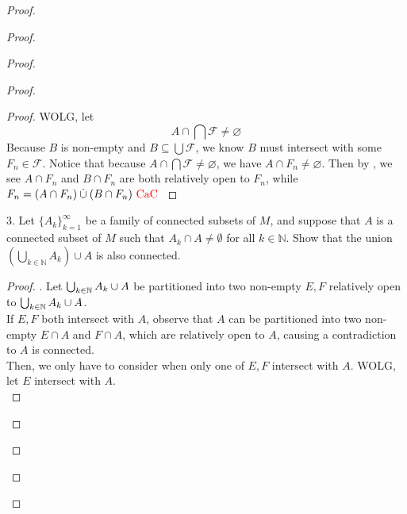 \documentclass{report}
\begin{document}
\begin{proof}
\begin{proof}
\begin{proof}
\begin{proof}
\begin{proof}
WOLG, let
\begin{equation}
A\cap \bigcap \mathcal{F}\neq \varnothing
\end{equation}
Because $B$ is non-empty and $B\subseteq \bigcup \mathcal{F}$, we know $B$ must intersect with some $F_n\in \mathcal{F}$. Notice that because $A\cap \bigcap \mathcal{F}\neq \varnothing$, we have $A\cap F_n\neq \varnothing$. Then by , we see $A\cap F_n$ and $B\cap F_n$ are both relatively open to $F_n$, while $F_n= (A\cap F_n)\mathbin{\dot{\cup}} (B\cap F_n)\text{ \textcolor{red}{CaC} }$ 
\end{proof}
\begin{question}{}{}
3. Let $\{A_k\}_{k=1}^{\infty}$ be a family of connected subsets of $M$, and suppose that $A$ is a connected subset of $M$ such that $A_k \cap A \neq \emptyset$ for all $k \in \mathbb{N}$. Show that the union $\left(\bigcup_{k \in \mathbb{N}} A_k\right) \cup A$ is also connected.
\end{question}
\begin{proof}
. Let $\bigcup_{k\in\mathbb{N}}A_k\cup A$ be partitioned into two non-empty  $E,F$ relatively open to  $\bigcup_{k\in\mathbb{N}}A_k\cup A$.\\

If $E,F$ both intersect with  $A$, observe that $A$ can be partitioned into two non-empty $E\cap A$ and $F\cap A$, which are relatively open to $A$, causing a contradiction to  $A$ is connected.\\

Then, we only have to consider when only one of  $E,F$ intersect with  $A$. WOLG, let  $E$ intersect with $A$.\\


\end{proof}
\end{proof}
\end{proof}
\end{proof}
\end{proof}
\end{document}
